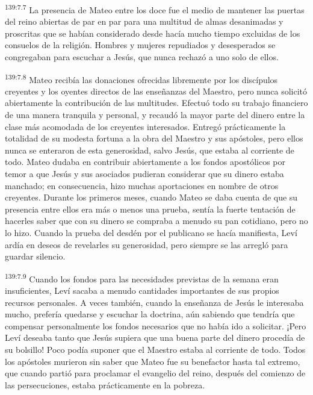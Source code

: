 \par
\textsuperscript{139:7.7} La presencia de Mateo entre los doce fue el medio de mantener las puertas del reino abiertas de par en par para una multitud de almas desanimadas y proscritas que se habían considerado desde hacía mucho tiempo excluidas de los consuelos de la religión. Hombres y mujeres repudiados y desesperados se congregaban para escuchar a Jesús, que nunca rechazó a uno solo de ellos.

\par
\textsuperscript{139:7.8} Mateo recibía las donaciones ofrecidas libremente por los discípulos creyentes y los oyentes directos de las enseñanzas del Maestro, pero nunca solicitó abiertamente la contribución de las multitudes. Efectuó todo su trabajo financiero de una manera tranquila y personal, y recaudó la mayor parte del dinero entre la clase más acomodada de los creyentes interesados. Entregó prácticamente la totalidad de su modesta fortuna a la obra del Maestro y sus apóstoles, pero ellos nunca se enteraron de esta generosidad, salvo Jesús, que estaba al corriente de todo. Mateo dudaba en contribuir abiertamente a los fondos apostólicos por temor a que Jesús y sus asociados pudieran considerar que su dinero estaba manchado; en consecuencia, hizo muchas aportaciones en nombre de otros creyentes. Durante los primeros meses, cuando Mateo se daba cuenta de que su presencia entre ellos era más o menos una prueba, sentía la fuerte tentación de hacerles saber que con su dinero se compraba a menudo su pan cotidiano, pero no lo hizo. Cuando la prueba del desdén por el publicano se hacía manifiesta, Leví ardía en deseos de revelarles su generosidad, pero siempre se las arregló para guardar silencio.

\par
\textsuperscript{139:7.9} Cuando los fondos para las necesidades previstas de la semana eran insuficientes, Leví sacaba a menudo cantidades importantes de sus propios recursos personales. A veces también, cuando la enseñanza de Jesús le interesaba mucho, prefería quedarse y escuchar la doctrina, aún sabiendo que tendría que compensar personalmente los fondos necesarios que no había ido a solicitar. ¡Pero Leví deseaba tanto que Jesús supiera que una buena parte del dinero procedía de su bolsillo! Poco podía suponer que el Maestro estaba al corriente de todo. Todos los apóstoles murieron sin saber que Mateo fue su benefactor hasta tal extremo, que cuando partió para proclamar el evangelio del reino, después del comienzo de las persecuciones, estaba prácticamente en la pobreza.

